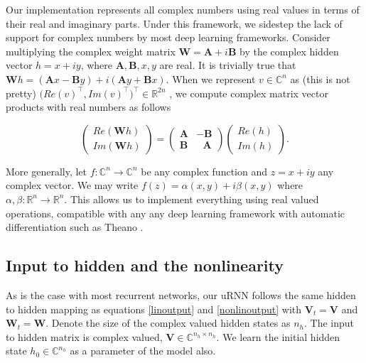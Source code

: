 \documentclass{article} %
\newcommand{\matr}[1]{\mathbf{#1}}
\newcommand\RR{\mathbb{R}}
\newcommand\CC{\mathbb{C}}
\begin{document}
Our implementation represents all complex numbers using real values in terms of their
real and imaginary parts. Under this framework, we sidestep the lack of support for complex numbers 
by most deep learning frameworks. Consider multiplying the complex weight matrix 
$\matr{W} = \matr{A} + i \matr{B}$ by the complex hidden vector $h = x + i y$, where
$\matr{A}, \matr{B}, x, y$ are real.
It is trivially true that $\matr{W}h = (\matr{A}x - \matr{B}y) + i (\matr{A}y + \matr{B}x)$.
When we represent $v \in \CC^n$ as {\color{red} (this is not pretty)} $\big(Re(v)^\top, Im(v)^\top \big)^\top \in \RR^{2n}$ , we
compute complex matrix vector products with real numbers as follows

\begin{equation} \begin{pmatrix} Re(\matr{W}h) \\ Im(\matr{W}h) \end{pmatrix}  
= \begin{pmatrix} \matr{A} & -\matr{B} \\ \matr{B} & \ \ \ 
\matr{A} \end{pmatrix} \begin{pmatrix} Re(h) \\ Im(h) \end{pmatrix} .
\end{equation}

More generally, let $f: \CC^n \rightarrow \CC^n$ be any complex function and $z = x + i y$ 
any complex vector. We may write $ f(z) = \alpha(x, y) + i \beta(x, y) $ where 
$\alpha, \beta : \RR^n \rightarrow \RR^n$. 
This allows us to implement everything using real valued operations, compatible with any
any deep learning framework with automatic differentiation such as Theano \citep{Fred2010}.

\subsection{Input to hidden and the nonlinearity}

As is the case with most recurrent networks, our uRNN follows the same hidden to hidden mapping as 
equations \ref{linoutput} and \ref{nonlinoutput} with $\matr{V}_t = \matr{V}$ and $\matr{W}_t = \matr{W}$. 
Denote the size of the complex valued hidden states as $n_h$.
The input to hidden matrix is complex valued, $\matr{V} \in \CC^{n_h \times n_h}$. 
We learn the initial hidden state $h_0 \in \CC^{n_h}$ as a parameter of the model also.
\end{document}

